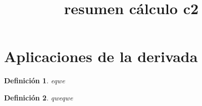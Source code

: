\documentclass[]{article}
\title{resumen cálculo c2}
\author{}
\date{}
\newtheorem{definition}{Definición}
\begin{document}
\section{Aplicaciones de la derivada}

\begin{definition}
eqwe
\end{definition}
\begin{definition}
qweqwe
\end{definition}
\end{document}
